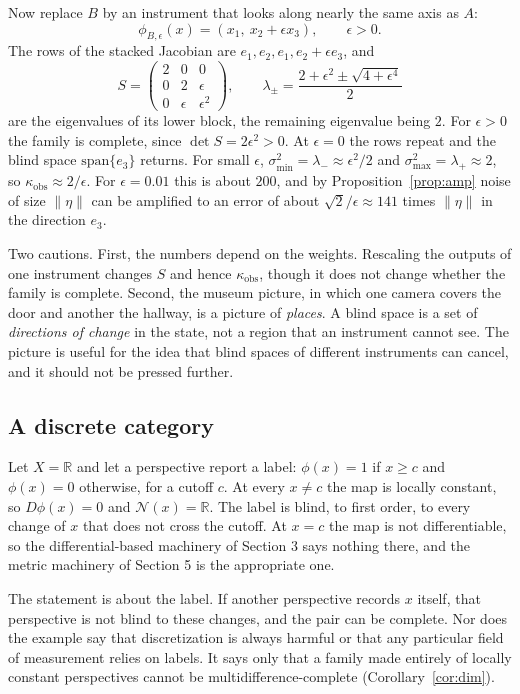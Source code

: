 \documentclass[11pt]{article}
\theoremstyle{remark}
\newcommand{\R}{\mathbb{R}}
\newcommand{\N}{\mathcal{N}}
\begin{document}
Now replace $B$ by an instrument that looks along nearly the same axis as $A$:
\[
\phi_{B,\epsilon}(x)=(x_1,\ x_2+\epsilon x_3),\qquad \epsilon>0 .
\]
The rows of the stacked Jacobian are $e_1,e_2,e_1,e_2+\epsilon e_3$, and
\[
S=\begin{pmatrix}2&0&0\\0&2&\epsilon\\0&\epsilon&\epsilon^2\end{pmatrix},
\qquad
\lambda_\pm=\frac{2+\epsilon^2\pm\sqrt{4+\epsilon^4}}{2}
\]
are the eigenvalues of its lower block, the remaining eigenvalue being $2$. For $\epsilon>0$ the family is complete, since $\det S=2\epsilon^2>0$. At $\epsilon=0$ the rows repeat and the blind space $\mathrm{span}\{e_3\}$ returns. For small $\epsilon$, $\sigma_{\min}^2=\lambda_-\approx\epsilon^2/2$ and $\sigma_{\max}^2=\lambda_+\approx2$, so $\kappa_{\mathrm{obs}}\approx2/\epsilon$. For $\epsilon=0.01$ this is about $200$, and by Proposition~\ref{prop:amp} noise of size $\|\eta\|$ can be amplified to an error of about $\sqrt2/\epsilon\approx141$ times $\|\eta\|$ in the direction $e_3$.

Two cautions. First, the numbers depend on the weights. Rescaling the outputs of one instrument changes $S$ and hence $\kappa_{\mathrm{obs}}$, though it does not change whether the family is complete. Second, the museum picture, in which one camera covers the door and another the hallway, is a picture of \emph{places}. A blind space is a set of \emph{directions of change} in the state, not a region that an instrument cannot see. The picture is useful for the idea that blind spaces of different instruments can cancel, and it should not be pressed further.

\subsection{A discrete category}

Let $X=\R$ and let a perspective report a label: $\phi(x)=1$ if $x\ge c$ and $\phi(x)=0$ otherwise, for a cutoff $c$. At every $x\neq c$ the map is locally constant, so $D\phi(x)=0$ and $\N(x)=\R$. The label is blind, to first order, to every change of $x$ that does not cross the cutoff. At $x=c$ the map is not differentiable, so the differential-based machinery of Section 3 says nothing there, and the metric machinery of Section 5 is the appropriate one.

The statement is about the label. If another perspective records $x$ itself, that perspective is not blind to these changes, and the pair can be complete. Nor does the example say that discretization is always harmful or that any particular field of measurement relies on labels. It says only that a family made entirely of locally constant perspectives cannot be multidifference-complete (Corollary~\ref{cor:dim}).
\end{document}
